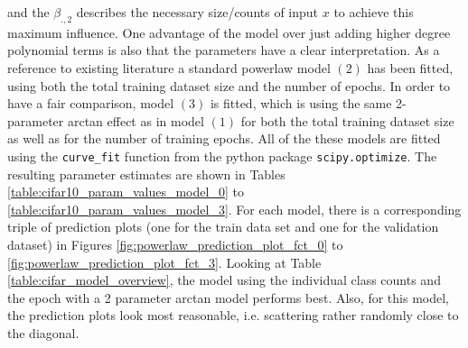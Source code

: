 \documentclass{article} %
\begin{document}
and the $\beta_{., 2}$ describes the necessary size/counts of input $x$ to achieve this maximum influence.
One advantage of the model over just adding higher degree polynomial terms is also that the parameters have a clear interpretation.
As a reference to existing literature a standard powerlaw model $(2)$ has been fitted, using both the total training dataset size and the number of epochs.
In order to have a fair comparison, model $(3)$ is fitted, which is using the same 2-parameter arctan effect as in model $(1)$ for both the total training dataset size as well as for the number of training epochs.
All of the these models are fitted using the \verb|curve_fit| function from the python package \verb|scipy.optimize|.
The resulting parameter estimates are shown in Tables \ref{table:cifar10_param_values_model_0} to \ref{table:cifar10_param_values_model_3}.
For each model, there is a corresponding triple of prediction plots (one for the train data set and one for the validation dataset) in Figures \ref{fig:powerlaw_prediction_plot_fct_0} to \ref{fig:powerlaw_prediction_plot_fct_3}.
Looking at Table \ref{table:cifar_model_overview}, the model using the individual class counts and the epoch with a 2 parameter arctan model performs best. 
Also, for this model, the prediction plots look most reasonable, i.e. scattering rather randomly close to the diagonal.
\end{document}
